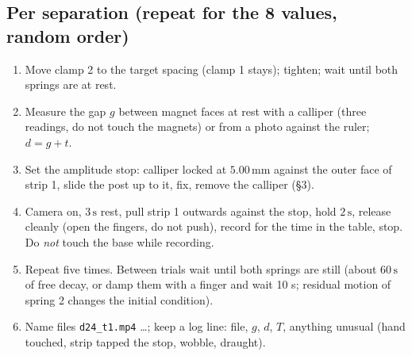 \documentclass[11pt,a4paper]{article}
\newcommand{\un}[1]{\,\mathrm{#1}}
\begin{document}
\subsection*{Per separation (repeat for the 8 values, random order)}
\begin{enumerate}[leftmargin=1.6em,itemsep=1pt]
\item Move clamp 2 to the target spacing (clamp 1 stays); tighten; wait until both springs are at rest.
\item Measure the gap $g$ between magnet faces at rest with a calliper (three readings, do not touch the magnets) or from a photo against the ruler; $d=g+t$.
\item Set the amplitude stop: calliper locked at $5.00\un{mm}$ against the outer face of strip 1, slide the post up to it, fix, remove the calliper (\S3).
\item Camera on, $3\un{s}$ rest, pull strip 1 outwards against the stop, hold $2\un{s}$, release cleanly (open the fingers, do not push), record for the time in the table, stop. Do \emph{not} touch the base while recording.
\item Repeat five times. Between trials wait until both springs are still (about $60\un{s}$ of free decay, or damp them with a finger and wait 10 s; residual motion of spring 2 changes the initial condition).
\item Name files \texttt{d24\_t1.mp4} \dots; keep a log line: file, $g$, $d$, $T$, anything unusual (hand touched, strip tapped the stop, wobble, draught).
\end{enumerate}
\end{document}

